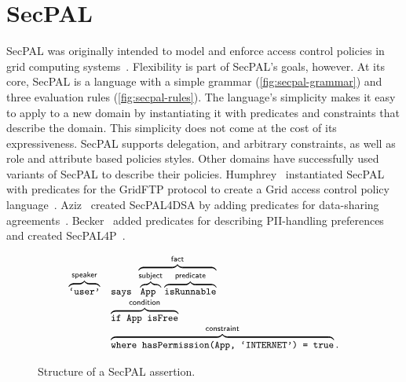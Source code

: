 \documentclass[thesis.tex]{subfiles}
\begin{document}
\section{SecPAL}

SecPAL was originally intended to model and enforce access control policies
    in grid computing systems~\cite{becker_secpal:_2010}. Flexibility is part of
    SecPAL's goals, however. At its core, SecPAL is a language with a simple grammar
    (\autoref{fig:secpal-grammar}) and three evaluation rules
    (\autoref{fig:secpal-rules}). The language's simplicity makes it easy to apply
    to a new domain by instantiating it with predicates and constraints that
    describe the domain. This simplicity does not come at the cost of its
    expressiveness. SecPAL supports delegation, and arbitrary constraints, as well
    as role and attribute based policies styles. Other domains have successfully
    used variants of SecPAL to describe their policies. Humphrey~\etal{} instantiated
    SecPAL with predicates for the GridFTP protocol to create a Grid access control
    policy language~\cite{humphrey_fine-grained_2007}. Aziz~\etal{} created SecPAL4DSA
    by adding predicates for data-sharing agreements~\cite{aziz_secpal4dsa:_2011}.
    Becker~\etal{} added predicates for describing \ac{PII}-handling preferences and
    created SecPAL4P~\cite{becker_framework_2009}.

\begin{figure}
  \newcommand{\bracetext}[1]{\text{\sffamily #1}}
  \newcommand{\smalltext}[1]{\text{\ttfamily\small #1}}
  \centering
    \begin{equation*}
      \begin{array}{r l}
        \overbrace{\smalltext{`user'}}^{\bracetext{speaker}} &
        \smalltext{ says }\overbrace{\overbrace{\smalltext{ App }}^{\bracetext{subject}}\overbrace{\smalltext{ isRunnable}}^{\bracetext{predicate}}}^{\bracetext{fact}} \\
        & \overbrace{\smalltext{ if App isFree}}^{\bracetext{condition}} \\
        & \overbrace{\smalltext{ where hasPermission(App, `INTERNET') = true}}^{\bracetext{constraint}}.
      \end{array}
    \end{equation*}
  \caption{Structure of a SecPAL assertion.}
  \label{fig:assertion}
\end{figure}
\end{document}
